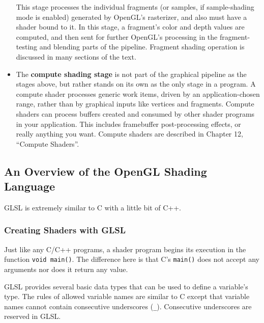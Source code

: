\documentclass[a4paper, 12pt]{article}
\newcounter{subsubsubsection}[subsubsection]
\begin{document}
\begin{itemize}
            This stage processes the individual fragments (or samples, if sample-shading mode is enabled) generated by OpenGL's rasterizer, and also must have a shader bound to it.
            In this stage, a fragment's color and depth values are computed, and then sent for further OpenGL's processing in the fragment-testing and blending parts of the pipeline.
            Fragment shading operation is discussed in many sections of the text.
      \item
            The \textbf{compute shading stage} is not part of the graphical pipeline as the stages above, but rather stands on its own as the only stage in a program.
            A compute shader processes generic work items, driven by an application-chosen range, rather than by graphical inputs like vertices and fragments.
            Compute shaders can process buffers created and consumed by other shader programs in your application.
            This includes framebuffer post-processing effects, or really anything you want.
            Compute shaders are described in Chapter 12, ``Compute Shaders''.

\end{itemize}

\subsection{An Overview of the OpenGL Shading Language}

GLSL is extremely similar to C with a little bit of C++.

\subsubsection{Creating Shaders with GLSL}


Just like any C/C++ programs, a shader program begins its execution in the function \verb|void main()|.
The difference here is that C's \verb|main()| does not accept any arguments nor does it return any value.


GLSL provides several basic data types that can be used to define a variable's type.
The rules of allowed variable names are similar to C except that variable names cannot contain consecutive underscores (\verb|_|).
Consecutive underscores are reserved in GLSL.
\end{document}
